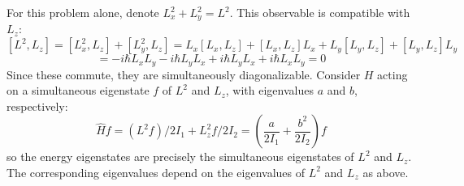 \documentclass{article}
\begin{document}
For this problem alone, denote $L_{x}^{2} + L_{y}^{2} = L^{2}$.
This observable is compatible with $L_{z}$:
\[
  [L^{2}, L_{z}] = [L_{x}^{2}, L_{z}] + [L_{y}^{2}, L_{z}]
  = L_{x}[L_{x}, L_{z}] + [L_{x}, L_{z}]L_{x} + L_{y}[L_{y}, L_{z}] + [L_{y}, L_{z}]L_{y}
\]
\[
  = -i\hbar L_{x}L_{y} - i\hbar L_{y}L_{x} + i\hbar L_{y}L_{x} + i\hbar L_{x}L_{y}
  = 0
\]
Since these commute, they are simultaneously diagonalizable.
Consider $H$ acting on a simultaneous eigenstate $f$ of $L^{2}$ and $L_{z}$, with eigenvalues $a$ and $b$, respectively:
\[
  \hat{H}f = (L^{2}f) / 2I_{1} + L_{z}^{2}f / 2I_{2} = \left( \frac{a}{2I_{1}} + \frac{b^{2}}{2I_{2}} \right)f
\]
so the energy eigenstates are precisely the simultaneous eigenstates of $L^{2}$ and $L_{z}$.
The corresponding eigenvalues depend on the eigenvalues of $L^{2}$ and $L_{z}$ as above.
\end{document}
